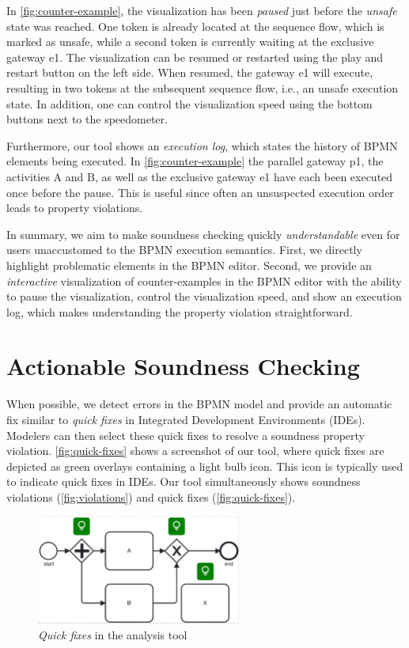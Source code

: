 \documentclass[runningheads]{llncs}
\begin{document}
In \autoref{fig:counter-example}, the visualization has been \textit{paused} just before the \textit{unsafe} state was reached.
One token is already located at the sequence flow, which is marked as unsafe, while a second token is currently waiting at the exclusive gateway \textsf{e1}.
The visualization can be resumed or restarted using the play and restart button on the left side.
When resumed, the gateway \textsf{e1} will execute, resulting in two tokens at the subsequent sequence flow, i.e., an unsafe execution state.
In addition, one can control the visualization speed using the bottom buttons next to the speedometer.

Furthermore, our tool shows an \textit{execution log}, which states the history of BPMN elements being executed.
In \autoref{fig:counter-example} the parallel gateway \textsf{p1}, the activities \textsf{A} and \textsf{B}, as well as the exclusive gateway \textsf{e1} have each been executed once before the pause.
This is useful since often an unsuspected execution order leads to property violations.

In summary, we aim to make soundness checking quickly \textit{understandable} even for users unaccustomed to the BPMN execution semantics.
First, we directly highlight problematic elements in the BPMN editor.
Second, we provide an \textit{interactive} visualization of counter-examples in the BPMN editor with the ability to pause the visualization, control the visualization speed, and show an execution log, which makes understanding the property violation straightforward.

\section{Actionable Soundness Checking}

When possible, we detect errors in the BPMN model and provide an automatic fix similar to \textit{quick fixes} in Integrated Development Environments (IDEs).
Modelers can then select these quick fixes to resolve a soundness property violation.
\autoref{fig:quick-fixes} shows a screenshot of our tool, where quick fixes are depicted as green overlays containing a light bulb icon.
This icon is typically used to indicate quick fixes in IDEs.
Our tool simultaneously shows soundness violations (\autoref{fig:violations}) and quick fixes (\autoref{fig:quick-fixes}).

\begin{figure}[ht]
	\centering
	\includegraphics[width=0.6\textwidth]{images/quickfixes}
	\caption{\textit{Quick fixes} in the analysis tool}
	\label{fig:quick-fixes}
\end{figure}
\end{document}

